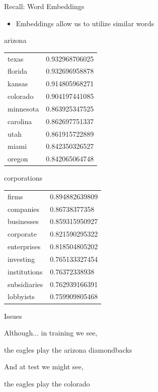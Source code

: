 \documentclass{beamer}
\begin{document}
\begin{frame}{Recall: Word Embeddings}
  \begin{itemize}
  \item Embeddings allow us to utilize similar words
  \end{itemize}

  arizona
  \begin{tabular}{ll}
  texas& 0.932968706025 \\
  florida & 0.932696958878\\
  kansas&0.914805968271\\
  colorado&0.904197441085\\
  minnesota&0.863925347525\\
  carolina&0.862697751337\\
  utah& 0.861915722889\\
  miami&0.842350326527\\
  oregon&0.842065064748\\
  \end{tabular}

  corporations
  \begin{tabular}{ll}
  firms& 0.894882639809\\
  companies&0.86738377358\\
  businesses&0.859315950927\\
  corporate&0.821590295322\\
  enterprises&0.818504805202\\
  investing&0.765133327454\\
  institutions&0.76372338938\\
  subsidiaries&0.762939166391\\
  lobbyists&0.759909805468\\
  \end{tabular}
\end{frame}

\begin{frame}{Issues}

  Although... in training we see, 

  \begin{center}
    the eagles play the arizona \alert{diamondbacks}
  \end{center}

  And at test we might see, 

  \begin{center}
    the eagles play the colorado  \alert{}
  \end{center}  
\end{frame}
\end{document}
